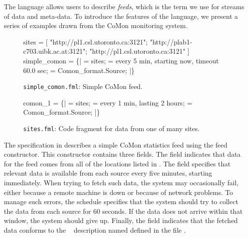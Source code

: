 The \padsd{} language allows users to describe {\em feeds}, which is
the term we use for streams of data and meta-data.
To introduce the features of the language,
we present a series of examples drawn from the CoMon monitoring system.

\begin{figure}[t]
\begin{code}
 sites = 
  [
  "http://pl1.csl.utoronto.ca:3121";
  "http://plab1-c703.uibk.ac.at:3121";
  "http://pl1.csl.utoronto.ca:3121"
  ] 
 simple_comon =
   \{|
      =  sites;
     = every 5 min, starting now, 
               timeout 60.0 sec; 
       = Comon_format.Source;  
  |\}
\end{code}
\shrink
\caption{\texttt{simple\_comon.fml}:  Simple CoMon feed.} 
\label{fig:simplecomon}
\end{figure}

\begin{figure}[t]
\begin{code}
 comon_1 =
   \{|
      =  sites;
     = every 1 min, 
              lasting 2 hours;
       = Comon_format.Source;
  |\}
\end{code}
\shrink
\caption{\texttt{sites.fml}:  Code fragment for data from one of many sites.}
\label{fig:comon_1}
\end{figure}


The \padsd{} specification in  describes a
simple CoMon statistics feed 
using the  feed constructor.  This constructor contains three fields.
The  field 
indicates that data for the feed comes from all of the locations
listed in .  The  field specifies that relevant
data is available from each source every five minutes, starting immediately.
When trying to fetch such data, the system may occasionally fail,
either because a remote machine is down or because of network
problems. To manage such errors, the schedule specifies that the
system should try to collect the data from each source for 60 seconds.
If the data does not arrive within that window, the system should give
up. Finally, the  field indicates that the fetched data
conforms to the \padsml{}~\cite{mandelbaum+:pads-ml} description named
 defined in the file .

